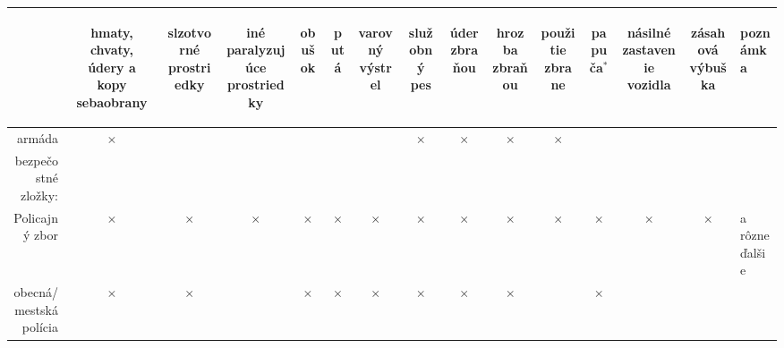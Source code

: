\documentclass[openany]{book}
\begin{document}
\begin{sidewaystable}

\begin{tabular}{|r|c|c|c|c|c|c|c|c|c|c|c|c|c|l|}
\hline
  & \begin{sideways}hmaty, chvaty, údery a kopy sebaobrany\end{sideways} & \begin{sideways}slzotvorné prostriedky\end{sideways} &  \begin{sideways}iné paralyzujúce prostriedky\end{sideways} & \begin{sideways}obušok\end{sideways} & \begin{sideways}putá\end{sideways} & \begin{sideways}varovný výstrel\end{sideways} & \begin{sideways}služobný pes\end{sideways} & \begin{sideways}úder zbraňou\end{sideways} & \begin{sideways}hrozba zbraňou\end{sideways} & \begin{sideways}použitie zbrane\end{sideways} & \begin{sideways}papuča$^*$\end{sideways} & \begin{sideways} násilné zastavenie vozidla\end{sideways} & \begin{sideways}zásahová výbuška\end{sideways} & \begin{sideways}poznámka\end{sideways}\\
\hline
armáda & $\times$ &  &  &  &  &  & $\times$ & $\times$ & $\times$ & $\times$ &  &  &  & \\
\hline
bezpečostné zložky: &  &  &  &  &  &  &  &  &  &  &  &  &  & \\
\hline
Policajný zbor & $\times$ & $\times$ & $\times$ & $\times$ & $\times$ & $\times$ & $\times$ & $\times$ & $\times$ & $\times$ & $\times$ & $\times$ & $\times$ & a rôzne ďalšie\\
\hline
obecná/mestská polícia & $\times$ & $\times$ &  & $\times$ & $\times$ & $\times$ & $\times$ & $\times$ & $\times$ &  & $\times$ &  &  & \\

\end{tabular}
\end{sidewaystable}
\end{document}
